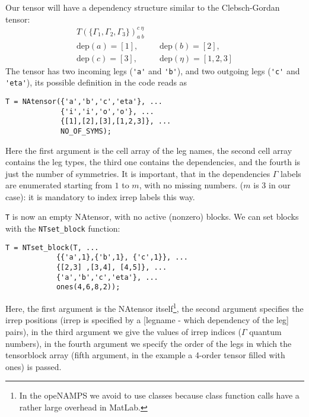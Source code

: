\documentclass[aps,prb,twocolumn,showpacs,preprintnumbers,amsmath,amssymb, superscriptaddressm, nofootinbib]{revtex4-2}   %
\newcommand{\dep}{\mathrm{dep}}
\begin{document}
Our tensor will have a dependency structure similar to the Clebsch-Gordan tensor:
\begin{eqnarray}
    T(\lbrace \Gamma_1, \Gamma_2, \Gamma_3 \rbrace)_{a~b}^{c~\eta} \nonumber \\
    \dep(a) = [1], &~& \dep(b) = [2], \nonumber \\ 
    \dep(c) = [3], &~& \dep(\eta) = [1,2,3]
\end{eqnarray}
The tensor has two incoming legs (\verb|'a'| and \verb|'b'|), and two outgoing legs (\verb|'c'| and \verb|'eta'|), its possible definition in the code reads as
\begin{verbatim}
T = NAtensor({'a','b','c','eta'}, ... 
             {'i','i','o','o'}, ... 
             {[1],[2],[3],[1,2,3]}, ... 
             NO_OF_SYMS);
\end{verbatim}
Here the first argument is the cell array of the leg names, the second cell array contains the leg types, the third one contains the dependencies, and the fourth is just the number of symmetries. It is important, that in the dependencies $\Gamma$ labels are enumerated starting from $1$ to $m$, with no missing numbers. ($m$ is $3$ in our case): it is mandatory to index irrep labels this way.

\verb|T| is now an empty NAtensor, with no active (nonzero) blocks. We can set blocks with the \verb|NTset_block| function:
\begin{verbatim}
T = NTset_block(T, ...
            {{'a',1},{'b',1}, {'c',1}}, ...
            {[2,3] ,[3,4], [4,5]}, ...
            {'a','b','c','eta'}, ...
            ones(4,6,8,2));
\end{verbatim}
Here, the first argument is the NAtensor itself\footnote{In the opeNAMPS we avoid to use classes because class function calls have a rather large overhead in MatLab.}, the second argument specifies the irrep positions (irrep is specified by a [legname - which dependency of the leg] pairs), in the third argument we give the values of irrep indices ($\Gamma$ quantum numbers), in the fourth argument we specify the order of the legs in which the tensorblock array (fifth argument, in the example a 4-order tensor filled with ones) is passed. 
\end{document}

